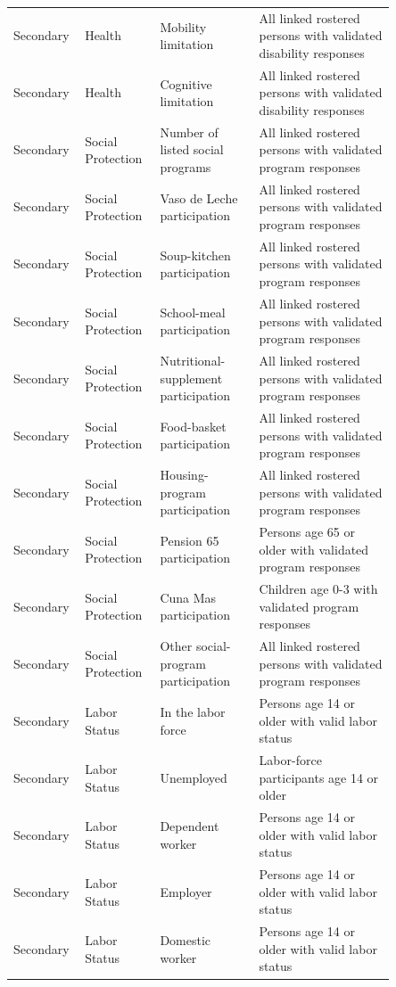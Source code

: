 \begin{longtable}{p{0.10\linewidth}p{0.18\linewidth}p{0.24\linewidth}p{0.33\linewidth}}
Secondary & Health & Mobility limitation & All linked rostered persons with validated disability responses \\
Secondary & Health & Cognitive limitation & All linked rostered persons with validated disability responses \\
Secondary & Social Protection & Number of listed social programs & All linked rostered persons with validated program responses \\
Secondary & Social Protection & Vaso de Leche participation & All linked rostered persons with validated program responses \\
Secondary & Social Protection & Soup-kitchen participation & All linked rostered persons with validated program responses \\
Secondary & Social Protection & School-meal participation & All linked rostered persons with validated program responses \\
Secondary & Social Protection & Nutritional-supplement participation & All linked rostered persons with validated program responses \\
Secondary & Social Protection & Food-basket participation & All linked rostered persons with validated program responses \\
Secondary & Social Protection & Housing-program participation & All linked rostered persons with validated program responses \\
Secondary & Social Protection & Pension 65 participation & Persons age 65 or older with validated program responses \\
Secondary & Social Protection & Cuna Mas participation & Children age 0-3 with validated program responses \\
Secondary & Social Protection & Other social-program participation & All linked rostered persons with validated program responses \\
Secondary & Labor Status & In the labor force & Persons age 14 or older with valid labor status \\
Secondary & Labor Status & Unemployed & Labor-force participants age 14 or older \\
Secondary & Labor Status & Dependent worker & Persons age 14 or older with valid labor status \\
Secondary & Labor Status & Employer & Persons age 14 or older with valid labor status \\
Secondary & Labor Status & Domestic worker & Persons age 14 or older with valid labor status \\

\end{longtable}
